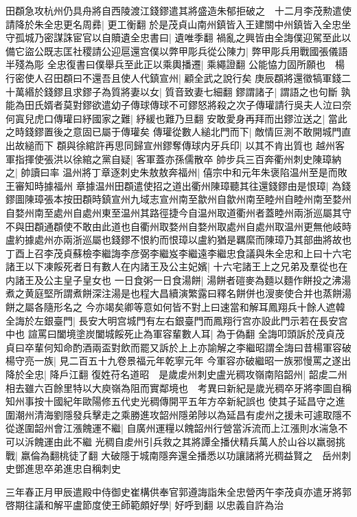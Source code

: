 田頵急攻杭州仍具舟將自西陵渡江錢鏐遣其將盛造朱郁拒破之　十二月李茂勲遣使請降於朱全忠更名周彞|{
	更工衡翻}
於是茂貞山南州鎮皆入王建關中州鎮皆入全忠坐守孤城乃密謀誅宦官以自贖遺全忠書曰|{
	遺唯季翻}
禍亂之興皆由全誨僕迎駕至此以備它盜公既志匡社稷請公迎扈還宫僕以弊甲彫兵從公陳力|{
	弊甲彫兵用戰國張儀語半殘為彫}
全忠復書曰僕舉兵至此正以乘輿播遷|{
	乘繩證翻}
公能恊力固所願也　楊行密使人召田頵曰不還吾且使人代鎮宣州|{
	顧全武之說行矣}
庚辰頵將還徵犒軍錢二十萬緡於錢鏐且求鏐子為質將妻以女|{
	質音致妻七細翻}
鏐謂諸子|{
	謂語之也句斷}
孰能為田氏婿者莫對鏐欲遣幼子傳球傳球不可鏐怒將殺之次子傳瓘請行吳夫人泣曰奈何寘兒虎口傳瓘曰紓國家之難|{
	紓緩也難乃旦翻}
安敢愛身再拜而出鏐泣送之|{
	當此之時錢鏐置後之意固已屬于傳瓘矣}
傳瓘從數人縋北門而下|{
	敵情叵測不敢開城門直出故縋而下}
頵與徐綰許再思同歸宣州鏐奪傳球内牙兵印|{
	以其不肯出質也}
越州客軍指揮使張洪以徐綰之黨自疑|{
	客軍蓋亦孫儒散卒}
帥步兵三百奔衢州刺史陳璋納之|{
	帥讀曰率}
温州將丁章逐刺史朱敖敖奔福州|{
	僖宗中和元年朱褒陷温州至是而敗王審知時據福州}
章據温州田頵遣使招之道出衢州陳璋聽其往還錢鏐由是恨璋|{
	為錢鏐圖陳璋張本按田頵時鎮宣州九域志宣州南至歙州自歙州南至睦州自睦州南至婺州自婺州南至處州自處州東至温州其路徑捷今自温州取道衢州者蓋睦州兩浙巡屬其守不與田頵通頵使不敢由此道也自衢州取婺州自婺州取處州自處州取温州更無他岐時盧約據處州亦兩浙巡屬也錢鏐不恨約而恨璋以盧約猶是羈縻而陳璋乃其部曲將故也}
丁酉上召李茂貞蘇檢李繼誨李彦弼李繼岌李繼遠李繼忠食議與朱全忠和上曰十六宅諸王以下凍餒死者日有數人在内諸王及公主妃嬪|{
	十六宅諸王上之兄弟及羣從也在内諸王及公主皇子皇女也}
一日食粥一日食湯餅|{
	湯餅者磑麥為麵以麵作餅投之沸湯煮之黄庭堅所謂煮餅深注湯是也程大昌續演繁露曰釋名餅併也溲麥使合并也蒸餅湯餅之屬各隨形名之}
今亦竭矣卿等意如何皆不對上曰速當和解耳鳳翔兵十餘人遮韓全誨於左銀臺門|{
	長安大明宫城門有左右銀臺門而鳳翔行宫亦設此門示若在長安宫中也}
諠罵曰闔境塗炭闔城餒死止為軍容輩數人耳|{
	為于偽翻}
全誨叩頭訴於茂貞茂貞曰卒輩何知命酌酒兩盃對飲而罷又訴於上上亦諭解之李繼昭謂全誨曰昔楊軍容破楊守亮一族|{
	見二百五十九卷景福元年乾寧元年}
今軍容亦破繼昭一族邪慢罵之遂出降於全忠|{
	降戶江翻}
復姓苻名道昭　是歲䖍州刺史盧光稠攻嶺南陷韶州|{
	韶䖍二州相去雖六百餘里特以大庾嶺為阻而實鄰境也　考異曰新紀是歲光稠卒牙將李圖自稱知州事按十國紀年歐陽修五代史光稠傳開平五年方卒新紀誤也}
使其子延昌守之進圍潮州清海劉隱發兵擊走之乘勝進攻韶州隱弟陟以為延昌有䖍州之援未可遽取隱不從遂圍韶州會江漲餽運不繼|{
	自廣州運糧以餽韶州行營當泝流而上江漲則水湍急不可以泝餽運由此不繼}
光稠自䖍州引兵救之其將譚全播伏精兵萬人於山谷以羸弱挑戰|{
	羸倫為翻桃徒了翻}
大破隱于城南隱奔還全播悉以功讓諸將光稠益賢之　岳州刺史鄧進思卒弟進忠自稱刺史

三年春正月甲辰遣殿中侍御史崔構供奉官郭遵誨詣朱全忠營丙午李茂貞亦遣牙將郭啓期往議和解平盧節度使王師範頗好學|{
	好呼到翻}
以忠義自許為治

